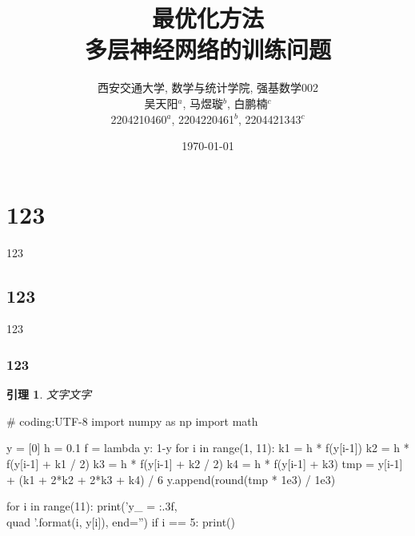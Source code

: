 \documentclass[12pt, a4paper, oneside]{ctexart}
\newtheorem{lemma}{引理}
\numberwithin{equation}{section}  %
\begin{document}
\title{最优化方法\\多层神经网络的训练问题}
\author{
西安交通大学, 数学与统计学院, 强基数学002\\[1ex]
吴天阳$^a$, 马煜璇$^b$, 白鹏楠$^c$\\[1ex]
2204210460$^a$, 2204220461$^b$, 2204421343$^c$
}
\date{\today}

\maketitle %
\clearpage %
\tableofcontents %

\clearpage

\section{123}
123
\subsection{123}
123
\subsubsection{123}
\begin{lemma}
    文字文字
\end{lemma}

\begin{pythoncode}
# coding:UTF-8
import numpy as np
import math

y = [0]
h = 0.1
f = lambda y: 1-y
for i in range(1, 11):
    k1 = h * f(y[i-1])
    k2 = h * f(y[i-1] + k1 / 2)
    k3 = h * f(y[i-1] + k2 / 2)
    k4 = h * f(y[i-1] + k3)
    tmp = y[i-1] + (k1 + 2*k2 + 2*k3 + k4) / 6
    y.append(round(tmp * 1e3) / 1e3)

for i in range(11):
    print('y_{{{}}} = {:.3f},\\quad '.format(i, y[i]), end='')
    if i == 5:
        print()
\end{pythoncode}
\end{document}
